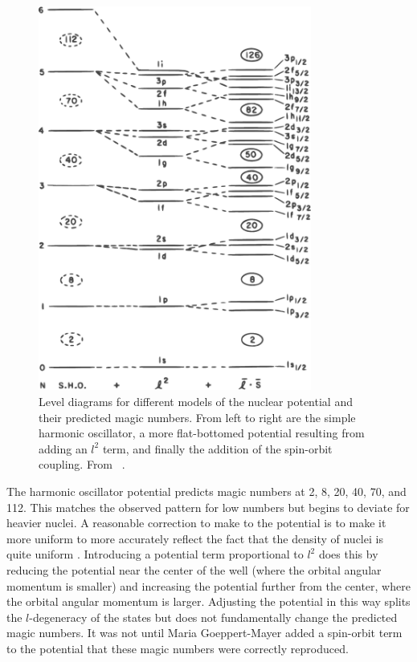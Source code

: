 \begin{figure}[htp]
\centering
\includegraphics[width=0.8\textwidth]{figures/nuclearLevels.eps}
\caption[Level diagrams for different models of the nuclear Hamiltonian.]{Level diagrams for different models of the nuclear potential and their predicted magic numbers.  From left to right are the simple harmonic oscillator, a more flat-bottomed potential resulting from adding an $l^2$ term, and finally the addition of the spin-orbit coupling.  From {}~\citep{Casten}.}
\label{fig:shellModelMagic}
\end{figure}
The harmonic oscillator potential predicts magic numbers at 2, 8, 20, 40, 70, and 112.  This matches the observed pattern for low numbers but begins to deviate for heavier nuclei.  A reasonable correction to make to the potential is to make it more uniform to more accurately reflect the fact that the density of nuclei is quite uniform \citep{Casten}.  Introducing a potential term proportional to $l^2$ does this by reducing the potential near the center of the well (where the orbital angular momentum is smaller) and increasing the potential further from the center, where the orbital angular momentum is larger.  Adjusting the potential in this way splits the $l$-degeneracy of the states but does not fundamentally change the predicted magic numbers.  It was not until Maria Goeppert-Mayer added a spin-orbit term to the potential \citep{MGM} that these magic numbers were correctly reproduced.  

